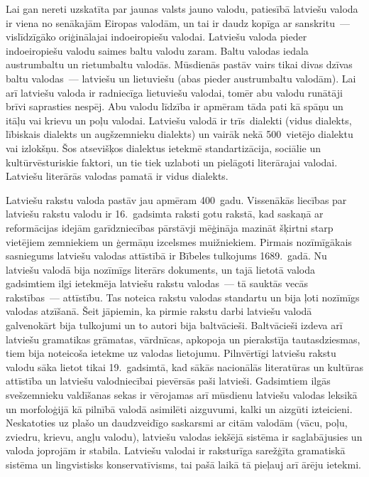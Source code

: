\begin{multicols}{2}
Lai gan nereti uzskatīta par jaunas valsts jauno valodu, patiesībā latviešu valoda ir viena no senākajām Eiropas valodām, un tai ir daudz kopīga ar sanskritu~--- vislīdzīgāko oriģinālajai indoeiropiešu valodai.
Latviešu valoda pieder indoeiropiešu valodu saimes baltu valodu zaram.
Baltu valodas iedala austrumbaltu un rietumbaltu valodās.
Mūsdienās pastāv vairs tikai divas dzīvas baltu valodas~--- latviešu un lietuviešu (abas pieder austrumbaltu valodām).
Lai arī latviešu valoda ir radniecīga lietuviešu valodai, tomēr abu valodu runātāji brīvi saprasties nespēj.
Abu valodu līdzība ir apmēram tāda pati kā spāņu un itāļu vai krievu un poļu valodai.
Latviešu \mbox{valodā} ir trīs~dialekti (vidus dialekts, lībiskais dialekts un augšzemnieku dialekts) un vairāk nekā 500~vietējo dialektu vai izlokšņu.
Šos atsevišķos dialektus ietekmē standartizācija, sociālie un kultūrvēsturiskie faktori, un tie tiek uzlaboti un pielāgoti literārajai valodai.
Latviešu literārās valodas pamatā ir vidus dialekts. 

Latviešu rakstu valoda pastāv jau apmēram 400~gadu.
Vissenākās liecības par latviešu rakstu valodu ir 16.~gadsimta raksti gotu rakstā, kad saskaņā ar reformācijas idejām garīdzniecības pārstāvji mēģināja mazināt šķirtni starp vietējiem zemniekiem un ģermāņu izcelsmes muižniekiem.
Pirmais nozīmīgākais sasniegums latviešu valodas attīstībā ir Bībeles tulkojums 1689.~gadā.
Nu latviešu valodā bija nozīmīgs literārs dokuments, un tajā lietotā valoda gadsimtiem ilgi ietekmēja latviešu rakstu valodas~--- tā sauktās vecās rakstības~--- attīstību.
Tas noteica rakstu valodas standartu un bija ļoti nozīmīgs valodas atzīšanā.
Šeit jāpiemin, ka pirmie rakstu darbi latviešu valodā galvenokārt bija tulkojumi un to autori bija baltvācieši.
Baltvācieši izdeva arī latviešu gramatikas grāmatas, vārdnīcas, apkopoja un pierakstīja tautasdziesmas, tiem bija noteicoša ietekme uz valodas lietojumu. 
Pilnvērtīgi latviešu rakstu valodu sāka lietot tikai 19.~gadsimtā, kad sākās nacionālās literatūras un kultūras attīstība un latviešu valodniecībai pievērsās paši latvieši. 
Gadsimtiem ilgās svešzemnieku valdīšanas sekas ir vērojamas arī mūsdienu latviešu valodas leksikā un morfoloģijā kā pilnībā valodā asimilēti aizguvumi, kalki un aizgūti izteicieni. 
Neskatoties uz plašo un daudzveidīgo saskarsmi ar citām valodām (vācu, poļu, zviedru, krievu, angļu valodu), latviešu valodas iekšējā sistēma ir saglabājusies un valoda joprojām ir stabila. 
Latviešu valodai ir raksturīga sarežģīta gramatiskā sistēma un lingvistisks konservatīvisms, tai pašā laikā tā pieļauj arī ārēju ietekmi.


\end{multicols}
